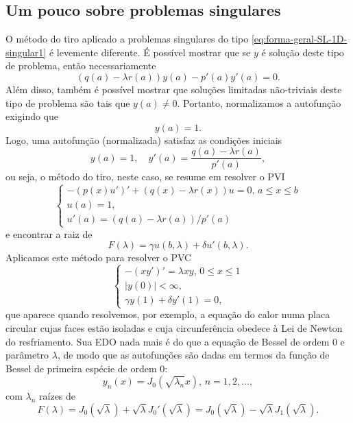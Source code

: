 \documentclass[twocolumn,showpacs,%
  nofootinbib,aps,superscriptaddress,%
  eqsecnum,prd,notitlepage,showkeys,10pt]{revtex4-1}
\renewcommand{\leq}{\leqslant}
\begin{document}
\subsection{Um pouco sobre problemas singulares}\label{subsec:singulares}
%
O método do tiro aplicado a problemas singulares do tipo \eqref{eq:forma-geral-SL-1D-singular1}
é levemente diferente. É possível mostrar \cite[Lema 148, p.~233]{Sturm-Liouville}
que se $y$ é solução deste tipo de problema,
então necessariamente
%
\[
   (q(a) - \lambda r(a))y(a) - p'(a)y'(a) = 0.
\]
%
Além disso, também é possível mostrar que soluções limitadas não-triviais deste tipo de
problema são tais que $y(a) \neq 0$. Portanto, normalizamos a autofunção exigindo que
%
\[
    y(a) = 1.
\]
%
Logo, uma autofunção (normalizada) satisfaz as condições iniciais
%
\[
    y(a) = 1, \quad
    y'(a) = \frac{q(a) - \lambda r(a)}{p'(a)},
\]
%
ou seja, o método do tiro, neste caso, se resume em resolver o PVI
%
\begin{equation}
\label{eq:algebrica-tiro-singular}
    \left\{
        \begin{array}{l}
            -(p(x)u')' + (q(x) - \lambda r(x))u = 0, \, a \leq x\leq b \\ 
            u(a) = 1, \\ 
            u'(a) = (q(a) - \lambda r(a))/p'(a)
        \end{array}
    \right.
\end{equation}
%
e encontrar a raiz de
%
\[
    F(\lambda) = \gamma u(b,\lambda) + \delta u'(b, \lambda).
\]
%
Aplicamos este método para resolver o PVC
%
\begin{equation}
\label{eq:singproblem}
    \left\{
        \begin{array}{l}
            -(xy')' = \lambda xy, \, 0 \leq x\leq 1 \\ 
            |y(0)| < \infty, \\ 
            \gamma y(1) + \delta y'(1) = 0,
        \end{array}
    \right.
\end{equation}
%
que aparece quando resolvemos, por exemplo, a equação do calor numa placa circular
cujas faces estão isoladas e cuja circunferência obedece à Lei de Newton do resfriamento.
Sua EDO nada mais é do que a equação de Bessel de ordem $0$ e parâmetro $\lambda$, de modo
que as autofunções são dadas em termos da função de Bessel de primeira espécie de ordem $0$:
%
\[
    y_n(x) = J_0\left(\sqrt{\lambda_n}x\right), \, n = 1, 2, \dots,
\]
%
com $\lambda_n$ raízes de
%
\[
    F(\lambda) = J_0\left(\sqrt{\lambda}\right) + \sqrt{\lambda}J_0'\left(\sqrt{\lambda}\right)
               = J_0\left(\sqrt{\lambda}\right) - \sqrt{\lambda}J_1\left(\sqrt{\lambda}\right).
\]
\end{document}
